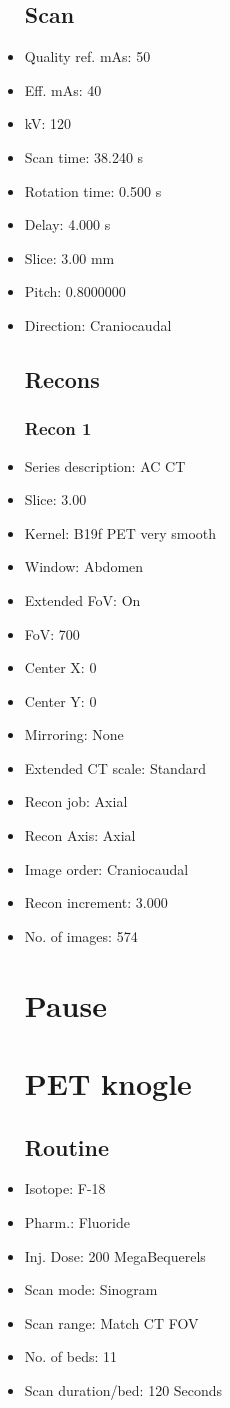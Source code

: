 \documentclass[12pt]{article}
\begin{document}
\begin{itemize}[noitemsep]
\subsection{Scan}
\item Quality ref. mAs: 50\item Eff. mAs: 40\item kV: 120\item Scan time: 38.240 s\item Rotation time: 0.500 s\item Delay: 4.000 s\item Slice: 3.00 mm\item Pitch: 0.8000000\item Direction: Craniocaudal\subsection{Recons}

\subsubsection{Recon 1}
\item Series description: AC CT
\item Slice: 3.00
\item Kernel: B19f PET very smooth
\item Window: Abdomen
\item Extended FoV: On
\item FoV: 700
\item Center X: 0
\item Center Y: 0
\item Mirroring: None
\item Extended CT scale: Standard
\item Recon job: Axial
\item Recon Axis: Axial
\item Image order: Craniocaudal
\item Recon increment: 3.000
\item No. of images: 574
\section{Pause}
\section{PET knogle}\subsection{Routine}
\item Isotope: F-18
\item Pharm.: Fluoride
\item Inj. Dose: 200 MegaBequerels
\item Scan mode: Sinogram
\item Scan range: Match CT FOV
\item No. of beds: 11
\item Scan duration/bed: 120 Seconds

\end{itemize}
\end{document}
